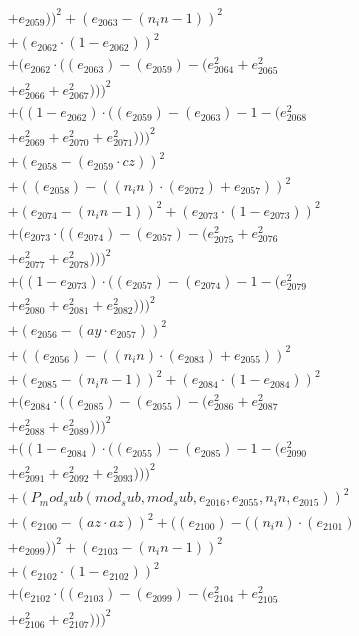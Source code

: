 \documentclass[10pt, a4paper]{article}
\begin{document}
\begin{small}
\begin{align*}
& + e_{2059}))^{2} + (e_{2063} - (n_in - 1))^{2} \\
& + (e_{2062}  \cdot  (1 - e_{2062}))^{2} \\
& + (e_{2062}  \cdot  ((e_{2063}) - (e_{2059}) - (e_{2064}^{2} + e_{2065}^{2} \\
& + e_{2066}^{2} + e_{2067}^{2})))^{2} \\
& + ((1 - e_{2062})  \cdot  ((e_{2059}) - (e_{2063}) - 1 - (e_{2068}^{2} \\
& + e_{2069}^{2} + e_{2070}^{2} + e_{2071}^{2})))^{2} \\
& + (e_{2058} - (e_{2059}  \cdot  cz))^{2} \\
& + ((e_{2058}) - ((n_in)  \cdot  (e_{2072}) + e_{2057}))^{2} \\
& + (e_{2074} - (n_in - 1))^{2} + (e_{2073}  \cdot  (1 - e_{2073}))^{2} \\
& + (e_{2073}  \cdot  ((e_{2074}) - (e_{2057}) - (e_{2075}^{2} + e_{2076}^{2} \\
& + e_{2077}^{2} + e_{2078}^{2})))^{2} \\
& + ((1 - e_{2073})  \cdot  ((e_{2057}) - (e_{2074}) - 1 - (e_{2079}^{2} \\
& + e_{2080}^{2} + e_{2081}^{2} + e_{2082}^{2})))^{2} \\
& + (e_{2056} - (ay  \cdot  e_{2057}))^{2} \\
& + ((e_{2056}) - ((n_in)  \cdot  (e_{2083}) + e_{2055}))^{2} \\
& + (e_{2085} - (n_in - 1))^{2} + (e_{2084}  \cdot  (1 - e_{2084}))^{2} \\
& + (e_{2084}  \cdot  ((e_{2085}) - (e_{2055}) - (e_{2086}^{2} + e_{2087}^{2} \\
& + e_{2088}^{2} + e_{2089}^{2})))^{2} \\
& + ((1 - e_{2084})  \cdot  ((e_{2055}) - (e_{2085}) - 1 - (e_{2090}^{2} \\
& + e_{2091}^{2} + e_{2092}^{2} + e_{2093}^{2})))^{2} \\
& + (P_mod_sub(mod_sub, mod_sub, e_{2016}, e_{2055}, n_in, e_{2015}))^{2} \\
& + (e_{2100} - (az  \cdot  az))^{2} + ((e_{2100}) - ((n_in)  \cdot  (e_{2101}) \\
& + e_{2099}))^{2} + (e_{2103} - (n_in - 1))^{2} \\
& + (e_{2102}  \cdot  (1 - e_{2102}))^{2} \\
& + (e_{2102}  \cdot  ((e_{2103}) - (e_{2099}) - (e_{2104}^{2} + e_{2105}^{2} \\
& + e_{2106}^{2} + e_{2107}^{2})))^{2} \\

\end{align*}
\end{small}
\end{document}

